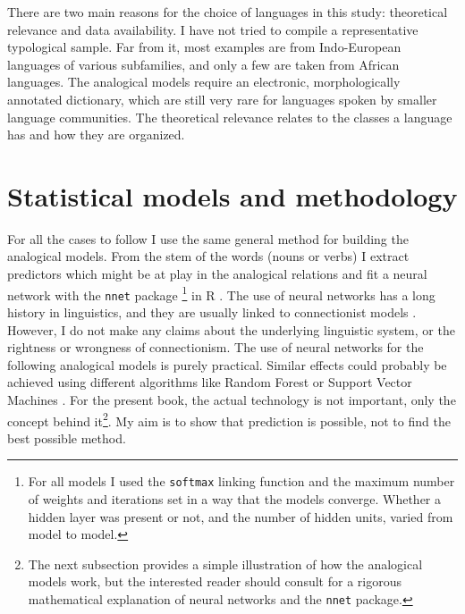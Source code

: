 There are two main reasons for the choice of languages in this study: theoretical relevance and data availability. I have not tried to compile a  representative typological sample. Far from it, most examples are from Indo-European languages of various subfamilies, and only a few are taken from African languages. The analogical models require an electronic, morphologically annotated dictionary, which are still very rare for languages spoken by smaller language communities. The theoretical relevance relates to the classes a language has and how they are organized.

\section{Statistical models and methodology}

\largerpage
For all the cases to follow I use the same general method for building the analogical models. From the stem of the words (nouns or verbs) I extract predictors which might be at play in the analogical relations and fit a neural network with the \texttt{nnet} package \autocite{Venables.2002}\footnote{For all models I used the \texttt{softmax} linking function and the maximum number of weights and iterations set in a way that the models converge. Whether a hidden layer was present or not, and the number of hidden units, varied from model to model.} in R \autocite{RDevelopmentCoreTeam.2008}. The use of neural networks has a long history in linguistics, and they are usually linked to connectionist models \autocite{Bechtel.2002, Churchland.1989, McClelland.1986, Rumelhart.1986}. However, I do not make any claims about the underlying linguistic system, or the rightness or wrongness of connectionism. The use of neural networks for the following analogical models is purely practical. Similar effects could probably be achieved using different algorithms like Random Forest \autocite{Breiman.2001a} or Support Vector Machines \autocites{Smola.1998, Scholkopf.2001}. For the present book, the actual technology is not important, only the concept behind it\footnote{The next subsection provides a simple illustration of how the analogical models work, but the interested reader should consult \textcite{Venables.2002} for a rigorous mathematical explanation of neural networks and the \texttt{nnet} package.}. My aim is to show that prediction is possible, not to find the best possible method.

